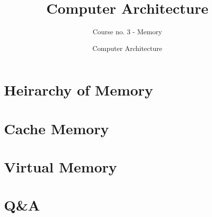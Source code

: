 \documentclass[usenames,dvipsnames]{beamer}             %
\title[Computer Architecture] %
{Computer Architecture}
\subtitle{Course no. 3 - Memory}
\author[Ștefan-Dan Ciocîrlan] %
{}
\institute[NUSTPB] %
{
  \inst{}%
  National University of Science and Technology\\
  POLITEHNICA Bucharest
}
\date[NUSTPB 2025] %
{Computer Architecture}
\begin{document}
\frame{\titlepage}

\section{Heirarchy of Memory}


\section{Cache Memory}


\section{Virtual Memory}


%

%

\section{Q\&A}
\begin{frame}
\end{frame}

\end{document}
